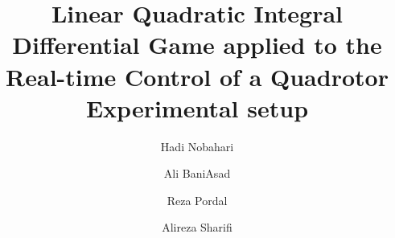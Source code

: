 \documentclass[3p,times]{elsarticle}
\begin{document}
\begin{frontmatter}



\dochead{}

\title{Linear Quadratic Integral Differential Game applied to the Real-time Control of a Quadrotor Experimental setup}


\author{Hadi Nobahari}
\address{Department of Aerospace Engineering
Sharif University of Technology Tehran, Iran}
\author{Ali BaniAsad}
\address{Department of Aerospace Engineering
Sharif University of Technology Tehran, Iran}
\author{Reza Pordal}
\address{Department of Aerospace Engineering
Sharif University of Technology Tehran, Iran}
\author{Alireza Sharifi}
\address{Department of Aerospace Engineering
Sharif University of Technology Tehran, Iran}

\address{}


\end{frontmatter}
\end{document}
